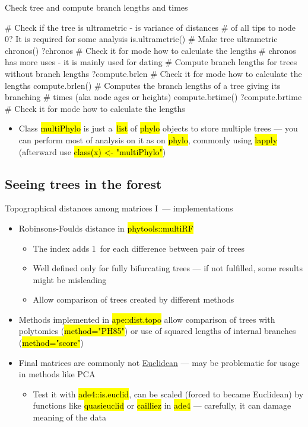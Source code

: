 \documentclass[compress, ucs, xelatex, 11pt, xcolor=svgnames,
  hyperref={
    bookmarks=true,
    unicode=true,
    colorlinks=true,
    pdftitle={Molecular data in R},
    plainpages=false,
    pdfauthor={Vojtech Zeisek},
    pdfsubject={Course about phylogeny and evolution in R},
    pdfcreator={XeLaTeX},
    pdfkeywords={R, evolution, phylogeny, molecular data},
    linkcolor=Tomato,
    anchorcolor=SaddleBrown,
    citecolor=Goldenrod,
    filecolor=DarkMagenta,
    menucolor=Sienna,
    urlcolor=DarkTurquoise,
    pdftex},
  url={hyphens, lowtilde} %
  ]{beamer}
\renewcommand{\texttt}[1]{\hl{\ttfamily #1}}
\begin{document}
\begin{frame}[fragile]{Check tree and compute branch lengths and times}
  \begin{spluscode}
    # Check if the tree is ultrametric - is variance of distances
    # of all tips to node 0? It is required for some analysis
    is.ultrametric()
    # Make tree ultrametric
    chronos()
    ?chronos # Check it for mode how to calculate the lengths
    # chronos has more uses - it is mainly used for dating
    # Compute branch lengths for trees without branch lengths
    ?compute.brlen # Check it for mode how to calculate the lengths
    compute.brlen()
    # Computes the branch lengths of a tree giving its branching
    # times (aka node ages or heights)
    compute.brtime()
    ?compute.brtime # Check it for mode how to calculate the lengths
  \end{spluscode}
  \begin{itemize}
    \item Class \texttt{multiPhylo} is just a~\texttt{list} of \texttt{phylo} objects to store multiple trees --- you can perform most of analysis on it as on \texttt{phylo}, commonly using \texttt{lapply} (afterward use \texttt{class(x) <- "multiPhylo"})
  \end{itemize}
\end{frame}

\subsection{Seeing trees in the forest}

\begin{frame}{Topographical distances among matrices I~--- implementations}
  \begin{itemize}
    \item Robinsons-Foulds distance in \texttt{phytools::multiRF}
    \begin{itemize}
      \item The index adds 1~for each difference between pair of trees
      \item Well defined only for fully bifurcating trees --- if not fulfilled, some results might be misleading
      \item Allow comparison of trees created by different methods
    \end{itemize}
    \item Methods implemented in \texttt{ape::dist.topo} allow comparison of trees with polytomies (\texttt{method="PH85"}) or use of squared lengths of internal branches (\texttt{method="score"})
    \item Final matrices are commonly not \href{https://en.wikipedia.org/wiki/Euclidean_distance_matrix}{Euclidean} --- may be problematic for usage in methods like PCA
    \begin{itemize}
      \item Test it with \texttt{ade4::is.euclid}, can be scaled (forced to became Euclidean) by functions like \texttt{quasieuclid} or \texttt{cailliez} in \texttt{ade4} --- carefully, it can damage meaning of the data
    \end{itemize}
  \end{itemize}
\end{frame}
\end{document}
